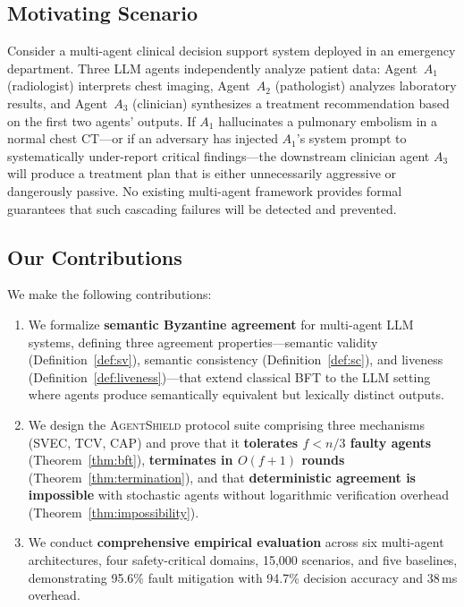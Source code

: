 \documentclass[journal,10pt]{IEEEtran}
\begin{document}
\subsection{Motivating Scenario}
Consider a multi-agent clinical decision support system deployed in an emergency department. Three LLM agents independently analyze patient data: Agent~$A_1$ (radiologist) interprets chest imaging, Agent~$A_2$ (pathologist) analyzes laboratory results, and Agent~$A_3$ (clinician) synthesizes a treatment recommendation based on the first two agents' outputs. If $A_1$ hallucinates a pulmonary embolism in a normal chest CT---or if an adversary has injected $A_1$'s system prompt to systematically under-report critical findings---the downstream clinician agent $A_3$ will produce a treatment plan that is either unnecessarily aggressive or dangerously passive. No existing multi-agent framework provides formal guarantees that such cascading failures will be detected and prevented.

\subsection{Our Contributions}
We make the following contributions:

\begin{enumerate}[leftmargin=*]
\item We formalize \textbf{semantic Byzantine agreement} for multi-agent LLM systems, defining three agreement properties---semantic validity (Definition~\ref{def:sv}), semantic consistency (Definition~\ref{def:sc}), and liveness (Definition~\ref{def:liveness})---that extend classical BFT to the LLM setting where agents produce semantically equivalent but lexically distinct outputs.

\item We design the \textsc{AgentShield} protocol suite comprising three mechanisms (SVEC, TCV, CAP) and prove that it \textbf{tolerates $f < n/3$ faulty agents} (Theorem~\ref{thm:bft}), \textbf{terminates in $O(f+1)$ rounds} (Theorem~\ref{thm:termination}), and that \textbf{deterministic agreement is impossible} with stochastic agents without logarithmic verification overhead (Theorem~\ref{thm:impossibility}).

\item We conduct \textbf{comprehensive empirical evaluation} across six multi-agent architectures, four safety-critical domains, 15{,}000 scenarios, and five baselines, demonstrating 95.6\% fault mitigation with 94.7\% decision accuracy and 38\,ms overhead.
\end{enumerate}
\end{document}
